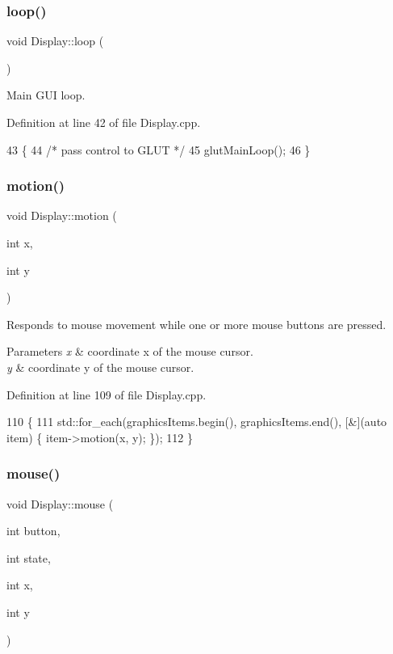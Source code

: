 \subsubsection{\texorpdfstring{loop()}{loop()}}
{\footnotesize\ttfamily void Display\+::loop (\begin{DoxyParamCaption}{ }\end{DoxyParamCaption})}

Main G\+UI loop. 

Definition at line 42 of file Display.\+cpp.


\begin{DoxyCode}
43 \{
44   \textcolor{comment}{/* pass control to GLUT */}
45   glutMainLoop();
46 \}
\end{DoxyCode}
\mbox{\label{classDisplay_a56b5e2138938b063f81e83ad9ed4dae3}} 
\subsubsection{\texorpdfstring{motion()}{motion()}}
{\footnotesize\ttfamily void Display\+::motion (\begin{DoxyParamCaption}\item[{int}]{x,  }\item[{int}]{y }\end{DoxyParamCaption})\hspace{0.3cm}{\ttfamily [static]}}

Responds to mouse movement while one or more mouse buttons are pressed. 
\begin{DoxyParams}{Parameters}
{\em x} & coordinate x of the mouse cursor. \\
\hline
{\em y} & coordinate y of the mouse cursor. \\
\hline
\end{DoxyParams}


Definition at line 109 of file Display.\+cpp.


\begin{DoxyCode}
110 \{
111   std::for\_each(graphicsItems.begin(), graphicsItems.end(), [&](\textcolor{keyword}{auto} item) \{ item->motion(x, y); \});
112 \}
\end{DoxyCode}
\mbox{\label{classDisplay_a711fdd8ee2c30e8e54d2883ae3e1bbf8}} 
\subsubsection{\texorpdfstring{mouse()}{mouse()}}
{\footnotesize\ttfamily void Display\+::mouse (\begin{DoxyParamCaption}\item[{int}]{button,  }\item[{int}]{state,  }\item[{int}]{x,  }\item[{int}]{y }\end{DoxyParamCaption})\hspace{0.3cm}{\ttfamily [static]}}

